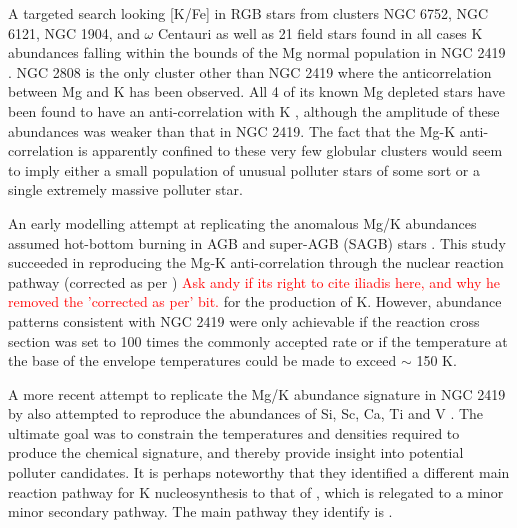 \documentclass[a4paper,fleqn,usenatbib]{mnras}
\newcommand{\todo}[1]{\textcolor{red}{#1}}
\begin{document}
A  targeted search looking [K/Fe] in RGB stars from clusters NGC 6752, NGC 6121, NGC 1904, and $\omega$ Centauri as well as 21 field stars 
 found in all cases K abundances falling within the bounds of the Mg normal population in NGC 2419 \citep{carretta2013}.
NGC 2808 is the only cluster other than NGC 2419 where the anticorrelation between Mg and K has been observed. All 4 of its known Mg depleted stars have been found to have an anti-correlation with K \citep{mucciarelli2015}, although the amplitude of these abundances was weaker than that in NGC 2419. The fact that the Mg-K anti-correlation is apparently confined to these very few globular clusters would seem to imply either a small population  of unusual polluter stars of some sort or a single extremely massive polluter star.

An early modelling attempt at replicating the anomalous Mg/K abundances assumed hot-bottom burning in AGB and super-AGB (SAGB) stars \citep{ventura2012}. This study succeeded in reproducing the Mg-K anti-correlation through the nuclear reaction pathway  (corrected as per \cite{iliadis2016}) \todo{Ask andy if its right to cite iliadis here, and why he removed the 'corrected as per' bit.} for the production of K. However, abundance patterns consistent with NGC 2419 were only achievable if the reaction cross section was set to 100 times the commonly accepted rate or if the temperature at the base of the envelope  temperatures could be made to exceed $\sim$ 150 K.

A more recent attempt to replicate the Mg/K abundance signature in NGC 2419 by \cite{iliadis2016} also attempted to reproduce the abundances of Si, Sc, Ca, Ti and V  \citep[elements reported as having weak correlations with Mg by][]{cohenkirby2012}. The ultimate goal was to constrain the temperatures and densities required to produce the chemical signature, and thereby provide insight into potential polluter candidates. It is perhaps noteworthy that they identified a different main reaction pathway for K nucleosynthesis to that of \cite{ventura2012}, which is relegated to a minor minor secondary pathway. The main pathway they identify is . 
\end{document}
